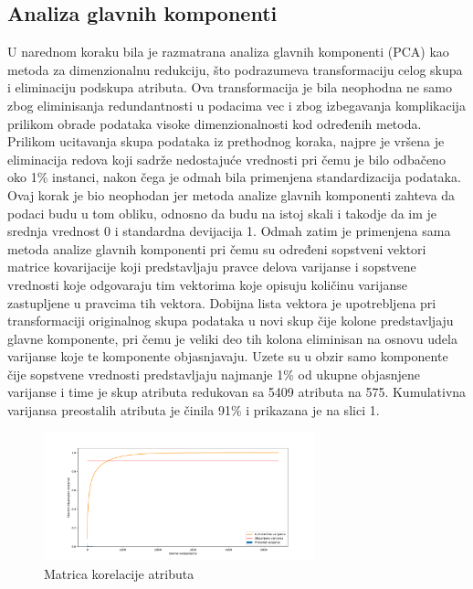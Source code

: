 \documentclass[12pt]{article}
\begin{document}
\subsection {Analiza glavnih komponenti}

U narednom koraku bila je razmatrana analiza glavnih komponenti (PCA) kao metoda za dimenzionalnu redukciju, što podrazumeva transformaciju celog skupa i eliminaciju podskupa atributa. Ova transformacija je bila neophodna ne samo zbog eliminisanja redundantnosti u podacima vec i zbog izbegavanja komplikacija prilikom obrade podataka visoke dimenzionalnosti kod određenih metoda. Prilikom ucitavanja skupa podataka iz prethodnog koraka, najpre je vršena je eliminacija redova koji sadrže nedostajuće vrednosti pri čemu je bilo odbačeno oko 1\% instanci, nakon čega je odmah bila primenjena standardizacija podataka. Ovaj korak je bio neophodan jer metoda analize glavnih komponenti zahteva da podaci budu u tom obliku, odnosno da budu na istoj skali i takodje da im je srednja vrednost 0 i standardna devijacija 1. Odmah zatim je primenjena sama metoda analize glavnih komponenti pri čemu su određeni sopstveni vektori matrice kovarijacije koji predstavljaju pravce delova varijanse i sopstvene vrednosti koje odgovaraju tim vektorima koje opisuju količinu varijanse zastupljene u pravcima tih vektora. Dobijna lista vektora je upotrebljena pri transformaciji originalnog skupa podataka u novi skup čije kolone predstavljaju glavne komponente, pri čemu je veliki deo tih kolona eliminisan na osnovu udela varijanse koje te komponente objasnjavaju. Uzete su u obzir samo komponente čije sopstvene vrednosti predstavljaju najmanje 1\% od ukupne objasnjene varijanse i time je skup atributa redukovan sa 5409 atributa na 575. Kumulativna varijansa preostalih atributa je činila 91\% i prikazana je na slici 1.

\begin{figure}[h]
    \centering
    \includegraphics[width=0.7\textwidth]{img/pca.png}
    \caption{Matrica korelacije atributa}
    \label{fig:mesh1}
\end{figure}
\end{document}
